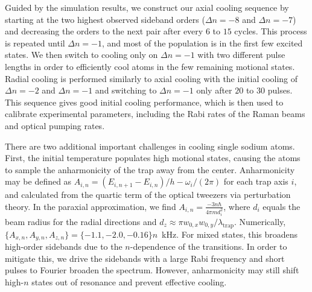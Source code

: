 \documentclass[aps,prl,twocolumn,groupedaddress]{revtex4-1}
\begin{document}
Guided by the simulation results,
we construct our axial cooling sequence by starting at the two highest
observed sideband orders ($\Delta n=-8$ and $\Delta n=-7$)
and decreasing the orders to the next pair after every $6$ to $15$ cycles.
This process is repeated until $\Delta n=-1$,
and most of the population is in the first few excited states.
We then switch to cooling only on $\Delta n=-1$ with two different pulse lengths
in order to efficiently cool atoms in the few remaining motional states.
Radial cooling is performed similarly to axial cooling with the initial cooling
of $\Delta n=-2$ and $\Delta n=-1$ and switching to $\Delta n=-1$ only after $20$ to $30$ pulses.
This sequence gives good initial cooling performance, which is then used to calibrate experimental
parameters, including the Rabi rates of the Raman beams and optical pumping rates.

There are two additional important challenges in cooling single sodium atoms.
First, the initial temperature populates high motional states,
causing the atoms to sample the anharmonicity of the trap away from the center.
Anharmonicity may be defined as $A_{i,n}=(E_{i,n+1}-E_{i,n})/h - \omega_i/(2\pi)$
for each trap axis $i$, and calculated from the quartic term
of the optical tweezers via perturbation theory.
In the paraxial approximation, we find $A_{i,n}=\frac{-3n\hbar}{4\pi m d_i^2}$,
where $d_i$ equals the beam radius for the radial directions and
$d_z\approx\pi w_{0,x}w_{0,y}/\lambda_{\textrm{trap}}$.
Numerically, $\{A_{x,n},A_{y,n},A_{z,n}\}=\{-1.1, -2.0, -0.16\}n$~kHz.
For mixed states, this broadens high-order sidebands due to the $n$-dependence of the transitions.
In order to mitigate this, we drive the sidebands with a large Rabi frequency
and short pulses to Fourier broaden the spectrum.
However, anharmonicity may still shift high-$n$ states out of resonance
and prevent effective cooling.
\end{document}
